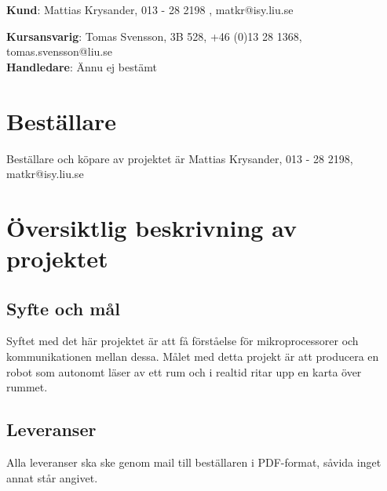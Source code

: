 \documentclass{article}
\begin{document}
\begin{center}
\textbf{Kund}: Mattias Krysander, 013 - 28 2198 , matkr@isy.liu.se
\end{center}

\begin{center}
\textbf{Kursansvarig}: Tomas Svensson, 3B 528, +46 (0)13 28 1368, tomas.svensson@liu.se \\
\textbf{Handledare}: Ännu ej bestämt
\end{center}
\vspace*{\fill}
\clearpage



\renewcommand*\contentsname{Innehållsförteckning}
\tableofcontents
\clearpage

\section{Beställare}
Beställare och köpare av projektet är Mattias Krysander, 013 - 28 2198, matkr@isy.liu.se

\section{Översiktlig beskrivning av projektet}

\subsection{Syfte och mål}
Syftet med det här projektet är att få förståelse för mikroprocessorer och kommunikationen mellan
dessa. Målet med detta projekt är att producera en robot som autonomt läser av ett rum och i realtid  ritar upp en karta över rummet.

\subsection{Leveranser}
Alla leveranser ska ske genom mail till beställaren i PDF-format, såvida inget annat står angivet.
\end{document}
